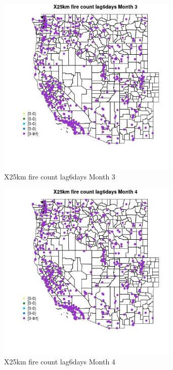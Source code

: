 \begin{figure} 
\centering  
\includegraphics[width=0.77\textwidth]{Code_Outputs/Report_ML_input_PM25_Step4_part_e_de_duplicated_aves_compiled_2019-05-14wNAs_MapObsMo3X25km_fire_count_lag6days.jpg} 
\caption{\label{fig:Report_ML_input_PM25_Step4_part_e_de_duplicated_aves_compiled_2019-05-14wNAsMapObsMo3X25km_fire_count_lag6days}X25km fire count lag6days Month 3} 
\end{figure} 
 

\begin{figure} 
\centering  
\includegraphics[width=0.77\textwidth]{Code_Outputs/Report_ML_input_PM25_Step4_part_e_de_duplicated_aves_compiled_2019-05-14wNAs_MapObsMo4X25km_fire_count_lag6days.jpg} 
\caption{\label{fig:Report_ML_input_PM25_Step4_part_e_de_duplicated_aves_compiled_2019-05-14wNAsMapObsMo4X25km_fire_count_lag6days}X25km fire count lag6days Month 4} 
\end{figure} 
 

